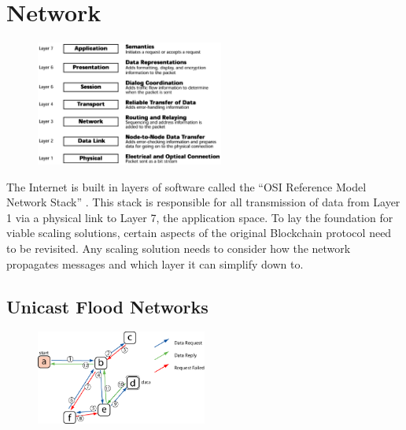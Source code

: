 \documentclass[11pt]{article}
\begin{document}
\section{Network}

\begin{figure}
    \centering
    \vspace{-15pt}
    \hspace{0pt}
    \includegraphics[width=0.55\textwidth]{./images/rsz_osi.png}
\end{figure}


The Internet is built in layers of software called the ``OSI Reference Model Network Stack'' \cite{NetworkOSI}.
This stack is responsible for all transmission of data from Layer 1 via a physical link to Layer 7, the application space. 
To lay the foundation for viable scaling solutions, certain aspects of the original Blockchain protocol need to be revisited.
Any scaling solution needs to consider how the network propagates messages and which layer it can simplify down to.

\newpage
\subsection{Unicast Flood Networks}

\begin{figure}
    \centering
    \vspace{0pt}
    \hspace{0pt}
    \includegraphics[width=0.50\textwidth]{./images/rsz_flood_network.png}
\end{figure}
\end{document}
